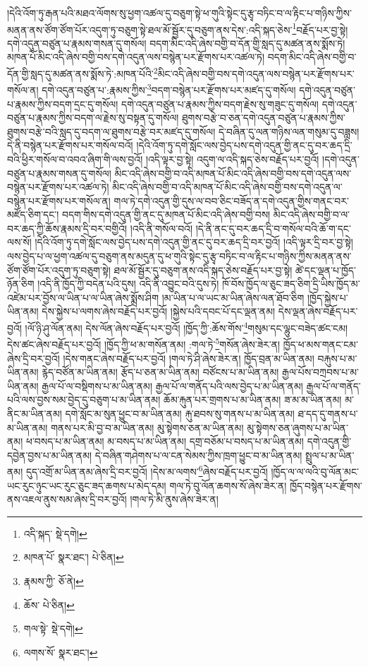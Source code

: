 །དེའི་འོག་ཏུ་རྒན་པའི་མཐའ་ལོགས་སུ་ཕྱག་འཚལ་དུ་བཅུག་སྟེ་ཕ་གུའི་སྟེང་དུ་རྩྭ་བཏིང་བ་ལ་རྟིང་པ་གཉིས་ཀྱིས་མནན་ནས་ཙོག་ཙོག་པོར་འདུག་ཏུ་བཅུག་སྟེ་ཐལ་མོ་སྦྱོར་དུ་བཅུག་ནས་དེས་:འདི་སྐད་ཅེས་\footnote{འདི་སྐད་  སྡེ་དགེ། }བརྗོད་པར་བྱ་སྟེ། དགེ་འདུན་བཙུན་པ་རྣམས་གསན་དུ་གསོལ། བདག་མིང་འདི་ཞེས་བགྱི་བ་དོན་གྱི་སླད་དུ་མཚན་ནས་སྨོས་ཏེ། མཁན་པོ་མིང་འདི་ཞེས་བགྱི་བས་དགེ་འདུན་ལས་བསྙེན་པར་རྫོགས་པར་འཚལ་ཏེ། བདག་མིང་འདི་ཞེས་བགྱི་བ་དོན་གྱི་སླད་དུ་མཚན་ནས་སྨོས་ཏེ་:མཁན་པོའི་\footnote{མཁན་པོ་  སྣར་ཐང་།  པེ་ཅིན། }མིང་འདི་ཞེས་བགྱི་བས་དགེ་འདུན་ལས་བསྙེན་པར་རྫོགས་པར་གསོལ་ན། དགེ་འདུན་བཙུན་པ་:རྣམས་ཀྱིས་\footnote{རྣམས་ཀྱི་  ཅོ་ནེ། }བདག་བསྙེན་པར་རྫོགས་པར་མཛད་དུ་གསོལ། དགེ་འདུན་བཙུན་པ་རྣམས་ཀྱིས་བདག་དྲང་དུ་གསོལ། དགེ་འདུན་བཙུན་པ་རྣམས་ཀྱིས་བདག་རྗེས་སུ་གཟུང་དུ་གསོལ། དགེ་འདུན་བཙུན་པ་རྣམས་ཀྱིས་བདག་ལ་རྗེས་སུ་བསྟན་དུ་གསོལ། ཐུགས་བརྩེ་བ་ཅན་དགེ་འདུན་བཙུན་པ་རྣམས་ཀྱིས་ཐུགས་བརྩེ་བའི་སླད་དུ་བདག་ལ་ཐུགས་བརྩེ་བར་མཛད་དུ་གསོལ། དེ་བཞིན་དུ་ལན་གཉིས་ལན་གསུམ་དུ་བཟླས། དེ་ནི་བསྙེན་པར་རྫོགས་པར་གསོལ་བའོ། །དེའི་འོག་ཏུ་དགེ་སློང་ལས་བྱེད་པས་དགེ་འདུན་གྱི་ནང་དུ་བར་ཆད་དྲི་བའི་ཕྱིར་གསོལ་བ་འབའ་ཞིག་གི་ལས་བྱའོ། །འདི་ལྟར་བྱ་སྟེ། འདུག་ལ་འདི་སྐད་ཅེས་བརྗོད་པར་བྱའོ། །དགེ་འདུན་བཙུན་པ་རྣམས་གསན་དུ་གསོལ། མིང་འདི་ཞེས་བགྱི་བ་འདི་མཁན་པོ་མིང་འདི་ཞེས་བགྱི་བས་དགེ་འདུན་ལས་བསྙེན་པར་རྫོགས་པར་འཚལ་ཏེ། མིང་འདི་ཞེས་བགྱི་བ་འདི་མཁན་པོ་མིང་འདི་ཞེས་བགྱི་བས་དགེ་འདུན་ལ་བསྙེན་པར་རྫོགས་པར་གསོལ་ན། གལ་ཏེ་དགེ་འདུན་གྱི་དུས་ལ་བབ་ཅིང་བཟོད་ན་དགེ་འདུན་གྱིས་གནང་བར་མཛོད་ཅིག་དང་། བདག་གིས་དགེ་འདུན་གྱི་ནང་དུ་མཁན་པོ་མིང་འདི་ཞེས་བགྱི་བས། མིང་འདི་ཞེས་བགྱི་བ་ལ་བར་ཆད་ཀྱི་ཆོས་རྣམས་དྲི་བར་བགྱིའོ། །འདི་ནི་གསོལ་བའོ། །དེ་ནི་ནང་དུ་བར་ཆད་དྲི་བ་གསོལ་བའི་ཆོ་ག་དང་ལས་སོ། །དེའི་འོག་ཏུ་དགེ་སློང་ལས་བྱེད་པས་དགེ་འདུན་གྱི་ནང་དུ་བར་ཆད་དྲི་བར་བྱའོ། །འདི་ལྟར་དྲི་བར་བྱ་སྟེ། ལས་བྱེད་པ་ལ་ཕྱག་འཚལ་དུ་བཅུག་ནས་མདུན་དུ་ཕ་གུའི་སྟེང་དུ་རྩྭ་བཏིང་བ་ལ་རྟིང་པ་གཉིས་ཀྱིས་མནན་ནས་ཙོག་ཙོག་པོར་འདུག་ཏུ་བཅུག་སྟེ། ཐལ་མོ་སྦྱོར་དུ་བཅུག་ནས་འདི་སྐད་ཅེས་བརྗོད་པར་བྱ་སྟེ། ཚེ་དང་ལྡན་པ་ཁྱོད་ཉོན་ཅིག །འདི་ནི་ཁྱོད་ཀྱི་བདེན་པའི་དུས། འདི་ནི་འབྱུང་བའི་དུས་ཏེ། ཁོ་བོས་ཁྱོད་ལ་ཅུང་ཟད་ཅིག་དྲི་ཡིས་ཁྱོད་མ་འཛེམ་པར་བྱོས་ལ་ཡིན་པ་ལ་ཡིན་ཞེས་སྨྲོས་ཤིག །མ་ཡིན་པ་ལ་ཡང་མ་ཡིན་ཞེས་ལན་ཐོབ་ཅིག །ཁྱོད་སྐྱེས་པ་ཡིན་ནམ། དེས་སྐྱེས་པ་ལགས་ཞེས་བརྗོད་པར་བྱའོ། །སྐྱེས་པའི་དབང་པོ་དང་ལྡན་ནམ། དེས་ལྡན་ཞེས་བརྗོད་པར་བྱའོ། །ལོ་ཉི་ཤུ་ལོན་ནམ། དེས་ལོན་ཞེས་བརྗོད་པར་བྱའོ། །ཁྱོད་ཀྱི་:ཆོས་གོས་\footnote{ཆོས་  པེ་ཅིན། }གསུམ་དང་ལྷུང་བཟེད་ཚང་ངམ། དེས་ཚང་ཞེས་བརྗོད་པར་བྱའོ། །ཁྱོད་ཀྱི་ཕ་མ་གསོན་ནམ། :གལ་ཏེ་\footnote{གལ་སྟེ་  སྡེ་དགེ། }གསོན་ཞེས་ཟེར་ན། ཁྱོད་ཕ་མས་གནང་ངམ་ཞེས་དྲི་བར་བྱའོ། །དེས་གནང་ཞེས་བརྗོད་པར་བྱའོ། །གལ་ཏེ་ཤི་ཞེས་ཟེར་ན། ཁྱོད་བྲན་མ་ཡིན་ནམ། བརྐུས་པ་མ་ཡིན་ནམ། རྙེད་བཙོན་མ་ཡིན་ནམ། རྩོད་པ་ཅན་མ་ཡིན་ནམ། བཙོངས་པ་མ་ཡིན་ནམ། རྒྱལ་པོས་བཀྲབས་པ་མ་ཡིན་ནམ། རྒྱལ་པོ་ལ་བསྡིགས་པ་མ་ཡིན་ནམ། རྒྱལ་པོ་ལ་གནོད་པའི་ལས་བྱེད་པ་མ་ཡིན་ནམ། རྒྱལ་པོ་ལ་གནོད་པའི་ལས་བྱས་སམ་བྱེད་དུ་བཅུག་པ་མ་ཡིན་ནམ། ཆོམ་རྐུན་པར་གྲགས་པ་མ་ཡིན་ནམ། ཟ་མ་མ་ཡིན་ནམ། མ་ནིང་མ་ཡིན་ནམ། དགེ་སློང་མ་སུན་ཕྱུང་བ་མ་ཡིན་ནམ། རྐུ་ཐབས་སུ་གནས་པ་མ་ཡིན་ནམ། ཐ་དད་དུ་གནས་པ་མ་ཡིན་ནམ། གནས་པར་མི་བྱ་བ་མ་ཡིན་ནམ། མུ་སྟེགས་ཅན་མ་ཡིན་ནམ། མུ་སྟེགས་ཅན་ཞུགས་པ་མ་ཡིན་ནམ། ཕ་བསད་པ་མ་ཡིན་ནམ། མ་བསད་པ་མ་ཡིན་ནམ། དགྲ་བཅོམ་པ་བསད་པ་མ་ཡིན་ནམ། དགེ་འདུན་གྱི་དབྱེན་བྱས་པ་མ་ཡིན་ནམ། དེ་བཞིན་གཤེགས་པ་ལ་ངན་སེམས་ཀྱིས་ཁྲག་ཕྱུང་བ་མ་ཡིན་ནམ། སྤྲུལ་པ་མ་ཡིན་ནམ། དུད་འགྲོ་མ་ཡིན་ནམ་ཞེས་དྲི་བར་བྱའོ། །དེས་མ་ལགས་\footnote{ལགས་སོ་  སྣར་ཐང་། }ཞེས་བརྗོད་པར་བྱའོ། །ཁྱོད་ལ་ལ་ལའི་བུ་ལོན་མང་ཡང་རུང་ཉུང་ཡང་རུང་ཅུང་ཟད་ཆགས་པ་མེད་དམ། གལ་ཏེ་བུ་ལོན་ཆགས་སོ་ཞེས་ཟེར་ན། ཁྱོད་བསྙེན་པར་རྫོགས་ནས་འཇལ་ནུས་སམ་ཞེས་དྲི་བར་བྱའོ། །གལ་ཏེ་མི་ནུས་ཞེས་ཟེར་ན། 